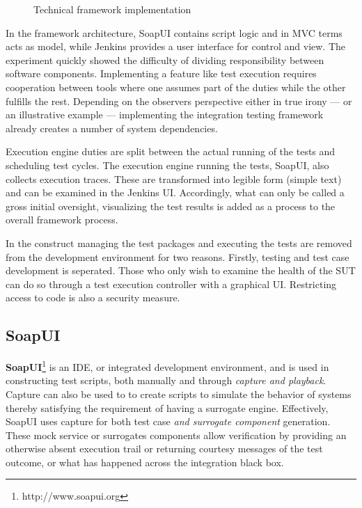 \documentclass[12pt,a4paper,oneside,pdftex]{report}
\begin{document}
{\begin{figure}[H]
\caption{Technical framework implementation} \label{fig:structure}
\end{figure}

In the framework architecture, SoapUI contains script logic and in MVC terms acts as model, while Jenkins provides a user interface for control and view. The experiment quickly showed the difficulty of dividing responsibility between software components. Implementing a feature like test execution requires cooperation between tools where one assumes part of the duties while the other fulfills the rest. Depending on the observers perspective either in true irony --- or an illustrative example --- implementing the integration testing framework already creates a number of system dependencies.

Execution engine duties are split between the actual running of the tests and scheduling test cycles. The execution engine running the tests, SoapUI, also collects execution traces. These are transformed into legible form (simple text) and can be examined in the Jenkins UI. Accordingly, what can only be called a gross initial oversight, visualizing the test results is added as a process to the overall framework process.

In the construct managing the test packages and executing the tests are removed from the development environment for two reasons. Firstly, testing and test case development is seperated. Those who only wish to examine the health of the SUT can do so through a test execution controller with a graphical UI. Restricting access to code is also a security measure.


\subsection{SoapUI}

\textbf{SoapUI}\footnote{http://www.soapui.org} is an IDE, or integrated development environment, and is used in constructing test scripts, both manually and through \emph{capture and playback}. Capture can also be used to to create scripts to simulate the behavior of systems thereby satisfying the requirement of having a surrogate engine. Effectively, SoapUI uses capture for both test case \emph{and surrogate component} generation. These mock service or surrogates components allow verification by providing an otherwise absent execution trail or returning courtesy messages of the test outcome, or what has happened across the integration black box.

}
\end{document}
